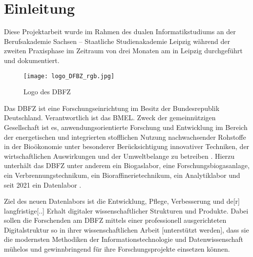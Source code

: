 
\chapter{Einleitung}




Diese Projektarbeit wurde im Rahmen des dualen Informatikstudiums an der Berufsakademie Sachsen -- Staatliche Studienakademie Leipzig während der zweiten Praxisphase im Zeitraum von drei Monaten am  in Leipzig durchgeführt und dokumentiert.

\begin{wrapfigure}{l}{.45\textwidth}
\centering
\texttt{[image: logo\_DFBZ\_rgb.jpg]}
\vspace{-10pt}
\caption{Logo des DBFZ}
\end{wrapfigure}

Das \ac{DBFZ} \cite{dbfzweb} ist eine Forschungseinrichtung im Besitz der Bundesrepublik Deutschland.
Verantwortlich ist das \ac{BMEL}.
Zweck der gemeinnützigen Gesellschaft ist es, \glqq anwendungsorientierte Forschung und Entwicklung im Bereich der energetischen und integrierten stofflichen Nutzung nachwachsender Rohstoffe in der Bioökonomie unter besonderer Berücksichtigung innovativer Techniken, der wirtschaftlichen Auswirkungen und der Umweltbelange\grqq{} zu betreiben \cite{dbfzwissauf}.
Hierzu unterhält das DBFZ unter anderem ein Biogaslabor, eine Forschungsbiogasanlage, ein Verbrennungstechnikum, ein Bioraffinerietechnikum, ein Analytiklabor und seit 2021 ein Datenlabor \cite{dbfzkonzept}.

Ziel des neuen Datenlabors ist die \glqq Entwicklung, Pflege, Verbesserung und de[r] langfristige[..] Erhalt digitaler wissenschaftlicher Strukturen und Produkte\grqq{}. Dabei sollen die \glqq Forschenden am DBFZ mittels einer professionell ausgerichteten Digitalstruktur so in ihrer wissenschaftlichen Arbeit [unterstützt werden], dass sie die modernsten Methodiken der Informationstechnologie und Datenwissenschaft mühelos und gewinnbringend für ihre Forschungsprojekte einsetzen können.\grqq{} \cite[26]{dbfzyearreport}

